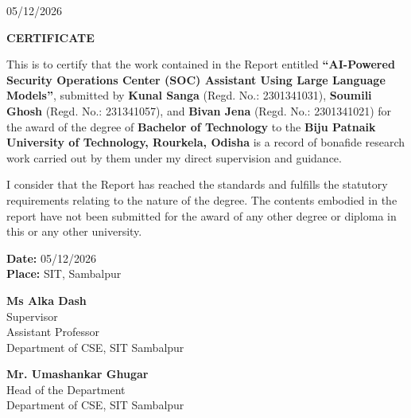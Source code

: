\documentclass[12pt,a4paper,oneside]{report}
\begin{document}
\vspace{0.5cm}

\begin{flushright}
05/12/2026
\end{flushright}

\vspace{0.8cm}

\begin{center}
    \textbf{\large CERTIFICATE}
\end{center}

\vspace{0.5cm}

\justifying

This is to certify that the work contained in the Report entitled
\textbf{``AI-Powered Security Operations Center (SOC) Assistant Using Large Language Models''}, submitted by
\textbf{Kunal Sanga} (Regd. No.: 2301341031), \textbf{Soumili Ghosh} (Regd. No.: 231341057), and \textbf{Bivan Jena} (Regd. No.: 2301341021) for the award of the degree
of \textbf{Bachelor of Technology} to the
\textbf{Biju Patnaik University of Technology, Rourkela, Odisha}
is a record of bonafide research work carried out by them under my direct
supervision and guidance.

I consider that the Report has reached the standards and fulfills the statutory requirements relating to the nature of the degree. The contents embodied in the report have not been submitted for the award of any other degree or diploma in this or any other university.

\vspace{0.8cm}

\noindent
\textbf{Date:} 05/12/2026\\
\textbf{Place:} SIT, Sambalpur

\vspace{0.8cm}

\noindent
\begin{minipage}[t]{0.48\textwidth}
    \textbf{Ms Alka Dash}\\
    Supervisor\\
    Assistant Professor\\
    Department of CSE, SIT Sambalpur
\end{minipage}
\hfill
\begin{minipage}[t]{0.48\textwidth}
    \begin{flushright}
    \textbf{Mr. Umashankar Ghugar}\\
    Head of the Department\\
    Department of CSE, SIT Sambalpur
    \end{flushright}
\end{minipage}
\end{document}
